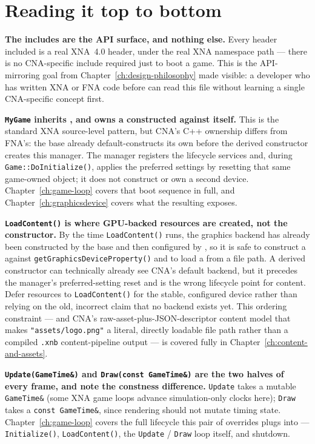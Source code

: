 \section{Reading it top to bottom}

\textbf{The includes are the API surface, and nothing else.} Every header included is a real
XNA~4.0 header, under the real XNA namespace path --- there is no CNA-specific include
required just to boot a game. This is the API-mirroring goal from
Chapter~\ref{ch:design-philosophy} made visible: a developer who has written XNA or FNA code
before can read this file without learning a single CNA-specific concept first.

\textbf{\texttt{MyGame} inherits , and owns a
 constructed against itself.} This is the standard XNA
source-level pattern, but CNA's C++ ownership differs from FNA's: the  base
already default-constructs its own  before the derived constructor
creates this manager. The manager registers the lifecycle services and, during
\texttt{Game::DoInitialize()}, applies the preferred settings by resetting that same game-owned
object; it does not construct or own a second device. Chapter~\ref{ch:game-loop} covers that
boot sequence in full, and Chapter~\ref{ch:graphicsdevice} covers what the resulting
 exposes.

\textbf{\texttt{LoadContent()} is where GPU-backed resources are created, not the
constructor.} By the time \texttt{LoadContent()} runs, the graphics backend has already been
constructed by the base  and then configured by
, so it is safe to construct a  against
\texttt{getGraphicsDeviceProperty()} and to load a  from a file path. A
derived constructor can technically already see CNA's default backend, but it precedes the
manager's preferred-setting reset and is the wrong lifecycle point for content. Defer resources
to \texttt{LoadContent()} for the stable, configured device rather than relying on the old,
incorrect claim that no backend exists yet. This ordering constraint --- and CNA's
raw-asset-plus-JSON-descriptor content model that makes
\texttt{"assets/logo.png"} a literal, directly loadable file path rather than a compiled
\texttt{.xnb} content-pipeline output --- is covered fully in
Chapter~\ref{ch:content-and-assets}.

\textbf{\texttt{Update(GameTime\&)} and \texttt{Draw(const GameTime\&)} are the two halves of
every frame, and note the constness difference.} \texttt{Update} takes a mutable
\texttt{GameTime\&} (some XNA game loops advance simulation-only clocks here);
\texttt{Draw} takes a \texttt{const GameTime\&}, since rendering should not mutate timing
state. Chapter~\ref{ch:game-loop} covers the full  lifecycle this pair of
overrides plugs into --- \texttt{Initialize()}, \texttt{LoadContent()}, the
\texttt{Update} / \texttt{Draw} loop itself, and shutdown.

